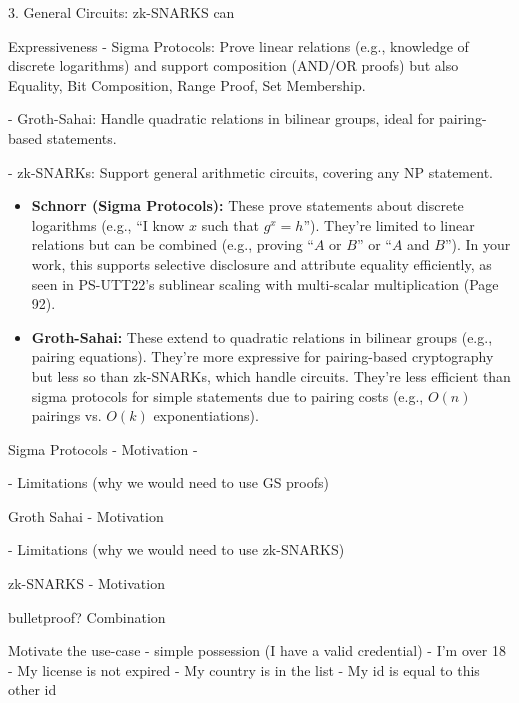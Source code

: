 3. General Circuits: zk-SNARKS can 

Expressiveness
- Sigma Protocols: Prove linear relations (e.g., knowledge of discrete logarithms) and support composition (AND/OR proofs) but also Equality, Bit Composition, Range Proof, Set Membership.

- Groth-Sahai: Handle quadratic relations in bilinear groups, ideal for pairing-based statements.

- zk-SNARKs: Support general arithmetic circuits, covering any NP statement.

\begin{itemize}
\item \textbf{Schnorr (Sigma Protocols):} These prove statements about discrete logarithms (e.g., ``I know $x$ such that $g^x = h$''). They're limited to linear relations but can be combined (e.g., proving ``$A$ or $B$'' or ``$A$ and $B$''). In your work, this supports selective disclosure and attribute equality efficiently, as seen in PS-UTT22's sublinear scaling with multi-scalar multiplication (Page 92).

\item \textbf{Groth-Sahai:} These extend to quadratic relations in bilinear groups (e.g., pairing equations). They're more expressive for pairing-based cryptography but less so than zk-SNARKs, which handle circuits. They're less efficient than sigma protocols for simple statements due to pairing costs (e.g., $O(n)$ pairings vs. $O(k)$ exponentiations).
\end{itemize}







Sigma Protocols
- Motivation
- 


- Limitations (why we would need to use GS proofs)

Groth Sahai
- Motivation



- Limitations (why we would need to use zk-SNARKS)

zk-SNARKS
- Motivation





bulletproof?
Combination





Motivate the use-case
- simple possession (I have a valid credential)
- I'm over 18
- My license is not expired
- My country is in the list
- My id is equal to this other id










